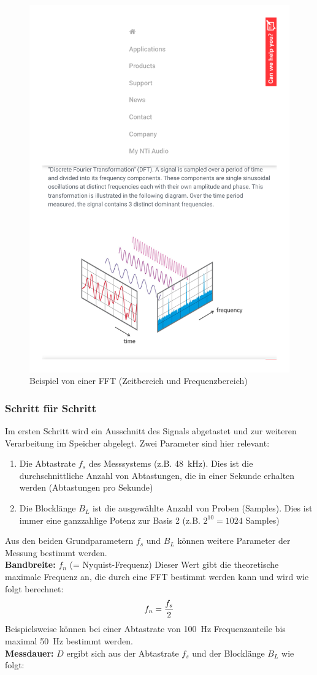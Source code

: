 \begin{figure}[htpb]
	\centering
	\includegraphics[width=0.5\linewidth]{Bilder/FFT_Bild_pdf_1.pdf}
	\caption{Beispiel von einer FFT (Zeitbereich und Frequenzbereich)\citep{NTIAudioFFT}}
	\label{fig:FFTBeispiel}
\end{figure}

\subsubsection{Schritt für Schritt}
Im ersten Schritt wird ein Ausschnitt des Signals abgetastet und zur weiteren Verarbeitung im Speicher abgelegt. Zwei Parameter sind hier relevant:
\begin{enumerate}
	\item Die Abtastrate $f_s$ des Messsystems (z.B. \SI{48}{\kilo\hertz}). Dies ist die durchschnittliche Anzahl von Abtastungen, die in einer Sekunde erhalten werden (Abtastungen pro Sekunde)
	\item Die Blocklänge $B_L$ ist die ausgewählte Anzahl von Proben (Samples). Dies ist immer eine ganzzahlige Potenz zur Basis 2 (z.B. $2^{10} = 1024$ Samples)
\end{enumerate}
Aus den beiden Grundparametern $f_s$ und $B_L$ können weitere Parameter der Messung bestimmt werden. \\
\textbf{Bandbreite:}  $f_n$ (= Nyquist-Frequenz) Dieser Wert gibt die theoretische maximale Frequenz an, die durch eine FFT bestimmt werden kann und wird wie folgt berechnet:
\begin{align}
	\centering
	f_n = \frac{f_s}{2}
	\label{gl:Nyquist-Frequenz}
\end{align}
Beispielsweise können bei einer Abtastrate von \SI{100}{\hertz} Frequenzanteile bis maximal \SI{50}{\hertz} bestimmt werden.\\
\textbf{Messdauer:} $D$ ergibt sich aus der Abtastrate $f_s$ und der Blocklänge $B_L$ wie folgt:

